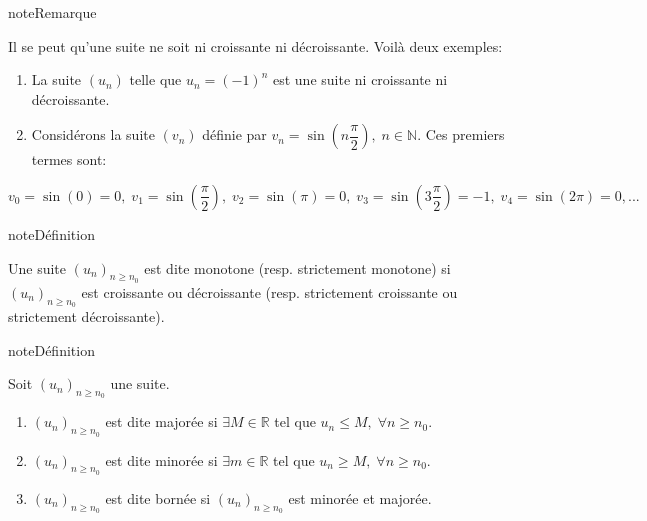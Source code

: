 \documentclass[letterpaper,10pt,french]{jupyterBook}
\begin{document}
\begin{sphinxadmonition}{note}{Remarque}

\sphinxAtStartPar
Il se peut qu’une suite ne soit ni croissante ni décroissante. Voilà deux exemples:
\begin{enumerate}
%
\item {} 
\sphinxAtStartPar
La suite \((u_n)\) telle que \(u_n=(-1)^n\) est une suite ni croissante ni décroissante.

\item {} 
\sphinxAtStartPar
Considérons la suite \((v_n)\) définie par \(v_n=\sin(n\dfrac{\pi}{2}),\;n\in\mathbb{N}.\) Ces premiers termes sont:

\end{enumerate}

\sphinxAtStartPar
\(v_0=\sin(0)=0,\;v_1=\sin(\dfrac{\pi}{2}),\;v_2=\sin(\pi)=0,\;v_3=\sin(3\dfrac{\pi}{2})=-1,\;v_4=\sin(2\pi)=0,...\)
\end{sphinxadmonition}

\begin{sphinxadmonition}{note}{Définition}

\sphinxAtStartPar
Une suite \((u_n)_{n\geq n_0}\) est dite monotone (resp. strictement monotone) si \((u_n)_{n\geq n_0}\) est croissante ou décroissante (resp. strictement croissante ou strictement décroissante).
\end{sphinxadmonition}

\begin{sphinxadmonition}{note}{Définition}

\sphinxAtStartPar
Soit \((u_n)_{n\geq n_0}\) une suite.
\begin{enumerate}
%
\item {} 
\sphinxAtStartPar
\((u_n)_{n\geq n_0}\) est dite majorée si \(\exists M\in \mathbb{R}\) tel que \(u_n\leq M,\;\forall n\geq n_0.\)

\item {} 
\sphinxAtStartPar
\((u_n)_{n\geq n_0}\) est dite minorée si \(\exists m\in \mathbb{R}\) tel que \(u_n\geq M,\;\forall n\geq n_0.\)

\item {} 
\sphinxAtStartPar
\((u_n)_{n\geq n_0}\) est dite bornée si \((u_n)_{n\geq n_0}\) est minorée et majorée.

\end{enumerate}
\end{sphinxadmonition}
\end{document}
